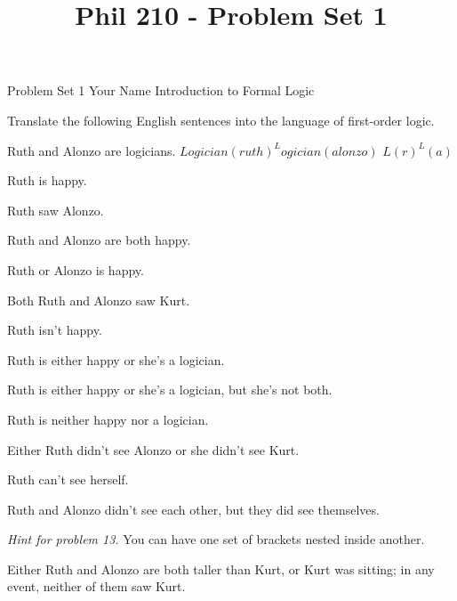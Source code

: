 
\title{Phil 210 - Problem Set 1}

\heading
Problem Set 1
Your Name
Introduction to Formal Logic
\endheading

Translate the following English sentences into the language of first-order logic.

\problems
{}
Ruth and Alonzo are logicians.
        \answer
        $ Logician(ruth) ^ Logician(alonzo) $ \OR $L(r)^L(a)$
        \endanswer

Ruth is happy.
        \answer
        $ $
        \endanswer

Ruth saw Alonzo.
        \answer
        $ $
        \endanswer

Ruth and Alonzo are both happy.
        \answer
        $ $
        \endanswer

Ruth or Alonzo is happy.
        \answer
        $ $
        \endanswer

Both Ruth and Alonzo saw Kurt.
        \answer
        $ $
        \endanswer

Ruth isn't happy.
        \answer
        $ $
        \endanswer

Ruth is either happy or she's a logician.
        \answer
        $ $
        \endanswer

Ruth is either happy or she's a logician, but she's not both.
        \answer
        $ $
        \endanswer

Ruth is neither happy nor a logician.
        \answer
        $ $
        \endanswer

Either Ruth didn't see Alonzo or she didn't see Kurt.
        \answer
        $ $
        \endanswer

Ruth can't see herself.
        \answer
        $ $
        \endanswer

Ruth and Alonzo didn't see each other, but they did see themselves.
        \answer
        $ $
        \endanswer
\endproblems

{\it Hint for problem 13.} You can have one set of brackets nested inside another.

\problems
{}
Either Ruth and Alonzo are both taller than Kurt, or Kurt was sitting; in any event, neither of them saw Kurt.
        \answer
        $ $
        \endanswer

\endproblems
\bye
